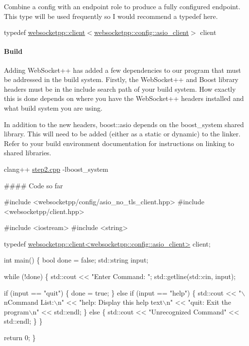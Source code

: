 Combine a config with an endpoint role to produce a fully configured endpoint. This type will be used frequently so I would recommend a typedef here.

{\ttfamily typedef \hyperlink{classwebsocketpp_1_1client}{websocketpp\+::client}$<$\hyperlink{structwebsocketpp_1_1config_1_1asio__client}{websocketpp\+::config\+::asio\+\_\+client}$>$ client}

\paragraph*{Build}

Adding Web\+Socket++ has added a few dependencies to our program that must be addressed in the build system. Firstly, the Web\+Socket++ and Boost library headers must be in the include search path of your build system. How exactly this is done depends on where you have the Web\+Socket++ headers installed and what build system you are using.

In addition to the new headers, boost\+::asio depends on the {\ttfamily boost\+\_\+system} shared library. This will need to be added (either as a static or dynamic) to the linker. Refer to your build environment documentation for instructions on linking to shared libraries.

{\ttfamily clang++ \hyperlink{step2_8cpp_source}{step2.\+cpp} -\/lboost\+\_\+system}

\#\#\#\# Code so far 
\begin{DoxyCode}
\textcolor{preprocessor}{#include <websocketpp/config/asio\_no\_tls\_client.hpp>}
\textcolor{preprocessor}{#include <websocketpp/client.hpp>}

\textcolor{preprocessor}{#include <iostream>}
\textcolor{preprocessor}{#include <string>}

\textcolor{keyword}{typedef} \hyperlink{classwebsocketpp_1_1client}{websocketpp::client<websocketpp::config::asio\_client>}
       client;

\textcolor{keywordtype}{int} main() \{
    \textcolor{keywordtype}{bool} done = \textcolor{keyword}{false};
    std::string input;

    \textcolor{keywordflow}{while} (!done) \{
        std::cout << \textcolor{stringliteral}{"Enter Command: "};
        std::getline(std::cin, input);

        \textcolor{keywordflow}{if} (input == \textcolor{stringliteral}{"quit"}) \{
            done = \textcolor{keyword}{true};
        \} \textcolor{keywordflow}{else} \textcolor{keywordflow}{if} (input == \textcolor{stringliteral}{"help"}) \{
            std::cout
                << \textcolor{stringliteral}{"\(\backslash\)nCommand List:\(\backslash\)n"}
                << \textcolor{stringliteral}{"help: Display this help text\(\backslash\)n"}
                << \textcolor{stringliteral}{"quit: Exit the program\(\backslash\)n"}
                << std::endl;
        \} \textcolor{keywordflow}{else} \{
            std::cout << \textcolor{stringliteral}{"Unrecognized Command"} << std::endl;
        \}
    \}

    \textcolor{keywordflow}{return} 0;
\}
\end{DoxyCode}


